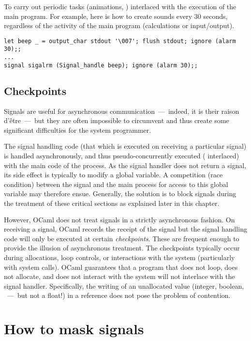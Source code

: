 \begin{example} 
To carry out periodic tasks (animations, \etc) interlaced with
the execution of the main program.  For example, here is how
to create  sounds every 30 seconds, regardless of
the activity of the main program (calculations or input/output).

\begin{lstlisting}
let beep _ = output_char stdout '\007'; flush stdout; ignore (alarm 30);;
...
signal sigalrm (Signal_handle beep); ignore (alarm 30);;
\end{lstlisting}
\end{example}

\subsection*{Checkpoints}

Signals are useful for asynchronous communication~---~indeed, it is their 
raison d'\^etre~---~but they are often impossible to 
circumvent and thus create some significant difficulties for the
system programmer.

The signal handling code (that which is executed on 
receiving a particular signal) is handled asynchronously, and thus 
pseudo-concurrently executed (\ie{} interlaced) with the main 
code of the process.  As the signal handler does not return
a signal, its side effect is typically to modify a global variable.
A competition (race condition) between the signal and the main process
for access to this global variable may therefore ensue.  Generally, the solution
is to block signals during the treatment of these critical sections as 
explained later in this chapter.  

However, OCaml does not treat signals in a strictly asynchronous
fashion.  On receiving a signal, OCaml records the receipt of the
signal but the signal handling code will only be executed at certain
\emph{checkpoints}.  These are frequent enough to provide the illusion
of asynchronous treatment.  The checkpoints typically occur during
allocations, loop controls, or interactions with the system
(particularly with system calls).  OCaml guarantees that a program
that does not loop, does not allocate, and does not interact with the
system will not interlace with the signal handler.  Specifically, the
writing of an unallocated value (integer, boolean, \etc{}~---~but not
a float!) in a reference does not pose the problem of contention.

\section{How to mask signals}

